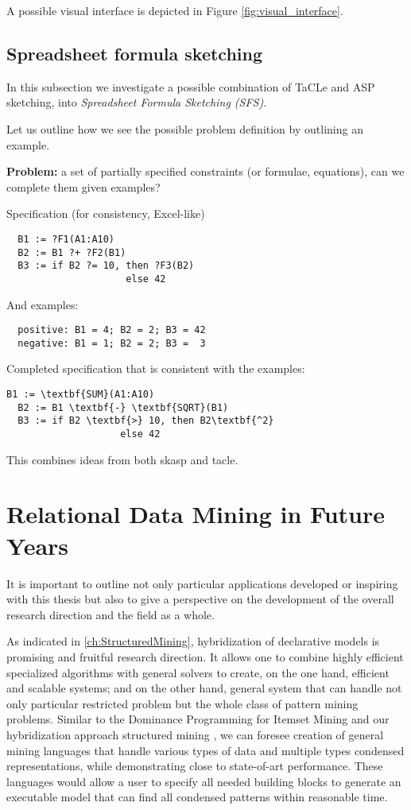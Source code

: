 A possible visual interface is depicted in Figure \ref{fig:visual_interface}.

\subsection{Spreadsheet formula sketching}
In this subsection we investigate a possible combination of TaCLe and
ASP sketching, into \textit{Spreadsheet Formula Sketching (SFS)}.

Let us outline how we see the possible problem definition by
outlining an example.

\textbf{Problem:} a set of partially specified constraints (or formulae, equations), can we complete them given examples?
 
  Specification (for consistency, Excel-like)
  \begin{verbatim}
  B1 := ?F1(A1:A10)
  B2 := B1 ?+ ?F2(B1)
  B3 := if B2 ?= 10, then ?F3(B2)
                     else 42
  \end{verbatim}
  And examples:
  \begin{verbatim}
  positive: B1 = 4; B2 = 2; B3 = 42 
  negative: B1 = 1; B2 = 2; B3 =  3
  \end{verbatim}
  

  Completed specification that is consistent with the examples:
  \begin{Verbatim}[commandchars=\\\{\}]
  B1 := \textbf{SUM}(A1:A10)
  B2 := B1 \textbf{-} \textbf{SQRT}(B1)
  B3 := if B2 \textbf{>} 10, then B2\textbf{^2}
                    else 42
  \end{Verbatim}

This combines ideas from both \acrshort{skasp} and \acrshort{tacle}.
  

\section{Relational Data Mining in Future Years}
It is important to outline not only particular applications developed
or inspiring with this thesis but also to give a perspective on the
development of the overall research direction and the field as a
whole.

As indicated in \ref{ch:StructuredMining}, hybridization of
declarative models is promising and fruitful research direction. It
allows one to combine highly efficient specialized algorithms with
general solvers to create, on the one hand, efficient and scalable
systems; and on the other hand, general system that can handle not
only particular restricted problem but the whole class of pattern
mining problems. Similar to the Dominance Programming for Itemset
Mining \cite{dominanceprogramming} and our hybridization approach structured mining \cite{ruleml_hybrid}, we can foresee creation of 
general mining languages that handle various types of data and
multiple types condensed representations, while demonstrating close to
state-of-art performance. These languages would allow a user to
specify all needed building blocks to generate an executable model
that can find all condensed patterns within reasonable time.

